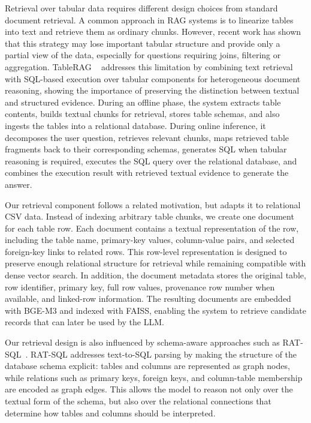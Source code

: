 \documentclass[11pt,a4paper]{article}
\begin{document}
Retrieval over tabular data requires different design choices from standard document retrieval. A common approach in RAG systems is to linearize tables into text and retrieve them as ordinary chunks. However, recent work has shown that this strategy may lose important tabular structure and provide only a partial view of the data, especially for questions requiring joins, filtering or aggregation. TableRAG ~\cite{yu2025tableragretrievalaugmentedgeneration} addresses this limitation by combining text retrieval with SQL-based execution over tabular components for heterogeneous document reasoning, showing the importance of preserving the distinction between textual and structured evidence. During an offline phase, the system extracts table contents, builds textual chunks for retrieval, stores table schemas, and also ingests the tables into a relational database. During online inference, it decomposes the user question, retrieves relevant chunks, maps retrieved table fragments back to their corresponding schemas, generates SQL when tabular reasoning is required, executes the SQL query over the relational database, and combines the execution result with retrieved textual evidence to generate the answer.

Our retrieval component follows a related motivation, but adapts it to relational CSV data. Instead of indexing arbitrary table chunks, we create one document for each table row. Each document contains a textual representation of the row, including the table name, primary-key values, column-value pairs, and selected foreign-key links to related rows. This row-level representation is designed to preserve enough relational structure for retrieval while remaining compatible with dense vector search. In addition, the document metadata stores the original table, row identifier, primary key, full row values, provenance row number when available, and linked-row information. The resulting documents are embedded with BGE-M3 and indexed with FAISS, enabling the system to retrieve candidate records that can later be used by the LLM.

Our retrieval design is also influenced by schema-aware approaches such as RAT-SQL~\cite{ratsql}. RAT-SQL addresses text-to-SQL parsing by making the structure of the database schema explicit: tables and columns are represented as graph nodes, while relations such as primary keys, foreign keys, and column-table membership are encoded as graph edges. This allows the model to reason not only over the textual form of the schema, but also over the relational connections that determine how tables and columns should be interpreted.
\end{document}
